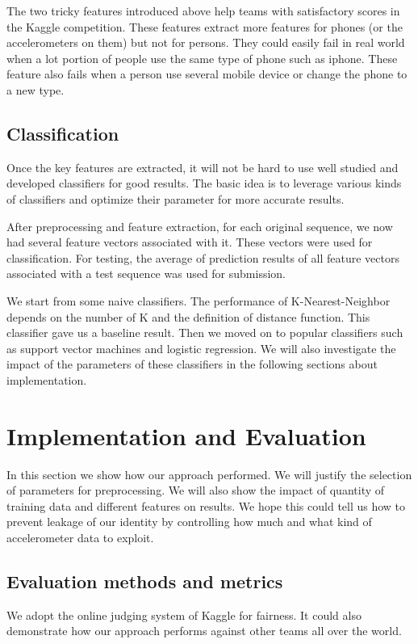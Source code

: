 \documentclass{article} %
\begin{document}
The two tricky features introduced above help teams with satisfactory scores in the Kaggle competition. These features extract more features for phones (or the accelerometers on them) but not for persons. They could easily fail in real world when a lot portion of people use the same type of phone such as iphone. These feature also fails when a person use several mobile device or change the phone to a new type. 

\subsection{Classification}

Once the key features are extracted, it will not be hard to use well studied and developed classifiers for good results. The basic idea is to leverage various kinds of classifiers and optimize their parameter for more accurate results.

After preprocessing and feature extraction, for each original sequence, we now had several feature vectors associated with it. These vectors were used for classification. For testing, the average of prediction results of all feature vectors associated with a test sequence was used for submission.

We start from some naive classifiers. The performance of K-Nearest-Neighbor depends on the number of K and the definition of distance function. This classifier gave us a baseline result. Then we moved on to popular classifiers such as support vector machines and logistic regression. We will also investigate the impact of the parameters of these classifiers in the following sections about implementation.


\section{Implementation and Evaluation}
In this section we show how our approach performed. We will justify the selection of parameters for preprocessing. We will also show the impact of quantity of training data and different features on results. We hope this could tell us how to prevent leakage of our identity by controlling how much and what kind of accelerometer data to exploit.

\subsection{Evaluation methods and metrics}
We adopt the online judging system of Kaggle for fairness. It could also demonstrate how our approach performs against other teams all over the world. 
\end{document}
